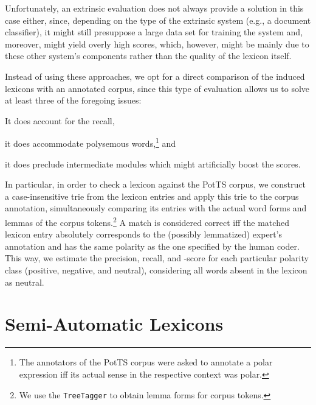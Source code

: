 Unfortunately, an extrinsic evaluation does not always provide a
solution in this case either, since, depending on the type of the
extrinsic system (e.g., a document classifier), it might still
presuppose a large data set for training the system and, moreover,
might yield overly high scores, which, however, might be mainly due to
these other system's components rather than the quality of the lexicon
itself.

Instead of using these approaches, we opt for a direct comparison of
the induced lexicons with an annotated corpus, since this type of
evaluation allows us to solve at least three of the foregoing issues:
\begin{inparaenum}[(i)]
  \item It does account for the recall,
  \item it does accommodate polysemous words,\footnote{The annotators
      of the PotTS corpus were asked to annotate a polar expression
      iff its actual sense in the respective context was polar.} and
  \item it does preclude intermediate modules which might artificially
    boost the scores.
\end{inparaenum}

In particular, in order to check a lexicon against the PotTS corpus,
we construct a case-insensitive trie \cite[pp. 492--512]{Knuth:98}
from the lexicon entries and apply this trie to the corpus annotation,
simultaneously comparing its entries with the actual word forms and
lemmas of the corpus tokens.\footnote{We use the \texttt{TreeTagger}
  \cite{Schmid:95} to obtain lemma forms for corpus tokens.} A match
is considered correct iff the matched lexicon entry absolutely
corresponds to the (possibly lemmatized) expert's annotation and has
the same polarity as the one specified by the human coder.  This way,
we estimate the precision, recall, and \F{}-score for each particular
polarity class (positive, negative, and neutral), considering all
words absent in the lexicon as neutral.

\section{Semi-Automatic Lexicons}

